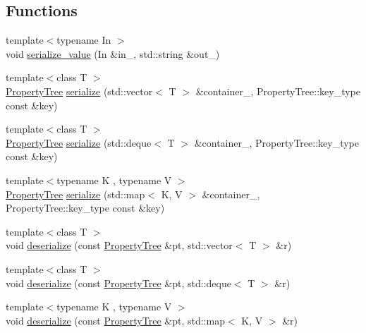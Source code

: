 \subsection*{Functions}
\begin{DoxyCompactItemize}
\item 
{\footnotesize template$<$typename In $>$ }\\void \hyperlink{namespaceserialize_afcd8d07d106f4bf71ce8813e6c2ccbd8}{serialize\+\_\+value} (In \&in\+\_\+, std\+::string \&out\+\_\+)
\item 
{\footnotesize template$<$class T $>$ }\\\hyperlink{namespacesolar__core_adeda2737d6938c190eb774a5b2495045}{Property\+Tree} \hyperlink{namespaceserialize_a48d3582d3d99189f6f067e77d962574f}{serialize} (std\+::vector$<$ T $>$ \&container\+\_\+, Property\+Tree\+::key\+\_\+type const \&key)
\item 
{\footnotesize template$<$class T $>$ }\\\hyperlink{namespacesolar__core_adeda2737d6938c190eb774a5b2495045}{Property\+Tree} \hyperlink{namespaceserialize_aa60e366236e42c68f437ea409aa0e056}{serialize} (std\+::deque$<$ T $>$ \&container\+\_\+, Property\+Tree\+::key\+\_\+type const \&key)
\item 
{\footnotesize template$<$typename K , typename V $>$ }\\\hyperlink{namespacesolar__core_adeda2737d6938c190eb774a5b2495045}{Property\+Tree} \hyperlink{namespaceserialize_a585cc862a49aec3bc1deca353af0b53c}{serialize} (std\+::map$<$ K, V $>$ \&container\+\_\+, Property\+Tree\+::key\+\_\+type const \&key)
\item 
{\footnotesize template$<$class T $>$ }\\void \hyperlink{namespaceserialize_a4c500beb6e6b8eb1c9e62376d3f5ce83}{deserialize} (const \hyperlink{namespacesolar__core_adeda2737d6938c190eb774a5b2495045}{Property\+Tree} \&pt, std\+::vector$<$ T $>$ \&r)
\item 
{\footnotesize template$<$class T $>$ }\\void \hyperlink{namespaceserialize_a067bdd480e2966e4a61457e64dfbca9e}{deserialize} (const \hyperlink{namespacesolar__core_adeda2737d6938c190eb774a5b2495045}{Property\+Tree} \&pt, std\+::deque$<$ T $>$ \&r)
\item 
{\footnotesize template$<$typename K , typename V $>$ }\\void \hyperlink{namespaceserialize_af7e18cf15b955d078b7fc036042cb083}{deserialize} (const \hyperlink{namespacesolar__core_adeda2737d6938c190eb774a5b2495045}{Property\+Tree} \&pt, std\+::map$<$ K, V $>$ \&r)

\end{DoxyCompactItemize}
